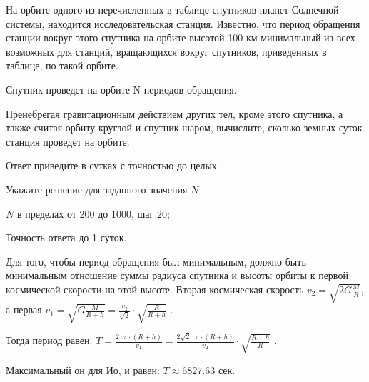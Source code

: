 
На орбите одного из перечисленных в таблице спутников планет Солнечной системы, находится исследовательская станция. Известно, что период обращения станции вокруг этого спутника на орбите высотой 100 км минимальный из всех возможных для станций, вращающихся вокруг спутников, приведенных в таблице, по такой орбите.


Спутник проведет на орбите N периодов обращения. 

Пренебрегая гравитационным действием других тел, кроме этого
спутника, а также считая орбиту круглой и спутник шаром, вычислите, сколько
земных суток станция проведет на орбите. 

Ответ приведите в сутках с точностью до целых.

Укажите решение для заданного значения $N$

\paramSection

$N$ в пределах от 200 до 1000, шаг 20;         

Точность ответа  до  1  суток.

\solutionSection

Для того, чтобы период обращения был минимальным, должно быть минимальным отношение суммы радиуса спутника  
и высоты орбиты к первой космической скорости на этой высоте. Вторая космическая скорость $v_2=\sqrt{2G \frac{M}{R}}$, 
а первая  $v_1=\sqrt{G \frac{M}{R+h}}=\frac{v_2}{\sqrt{2}} \cdot \sqrt{\frac{R}{R+h}}$ .

Тогда период равен:  $T=\frac{2 \cdot \pi \cdot (R+h)}{  v_1 }=\frac{2\sqrt{2} \cdot \pi \cdot (R+h)}{v_2}  \cdot \sqrt{\frac{R+h}{R}}$ .

Максимальный он для Ио, и равен:  $ T \approx 6827.63$ сек.


